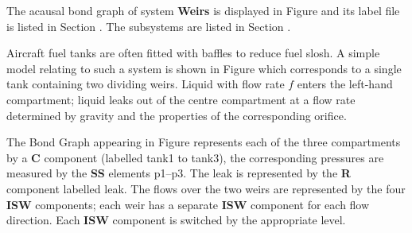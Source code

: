 
%

   The acausal bond graph of system \textbf{Weirs} is
   displayed in Figure  and its label
   file is listed in Section .
   The subsystems are listed in Section .


Aircraft fuel tanks are often fitted with baffles to reduce fuel
slosh. A simple model relating to such a system is shown in Figure
 which corresponds to a single tank containing two
dividing weirs. Liquid with flow rate $f$ enters the left-hand
compartment; liquid leaks out of the centre compartment at a flow rate
determined by gravity and the properties of the corresponding orifice.

The Bond Graph appearing in Figure  represents each of
the three compartments by a \textbf{C} component (labelled tank1 to
tank3), the corresponding pressures are measured by the \textbf{SS}
elements p1--p3. The leak is represented by the \textbf{R} component
labelled leak. The flows over the two weirs are represented by the four
\textbf{ISW} components; each weir has a separate \textbf{ISW}
component for each flow direction. Each \textbf{ISW} component is
switched by the appropriate level.


